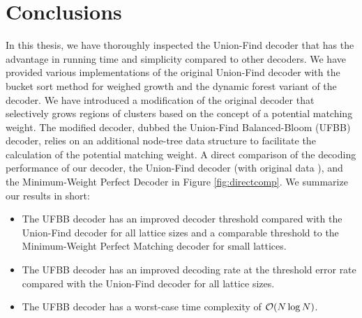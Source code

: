 \chapter{Conclusions}

In this thesis, we have thoroughly inspected the Union-Find decoder that has the advantage in running time and simplicity compared to other decoders. We have provided various implementations of the original Union-Find decoder with the bucket sort method for weighed growth and the dynamic forest variant of the decoder. We have introduced a modification of the original decoder that selectively grows regions of clusters based on the concept of a potential matching weight. The modified decoder, dubbed the Union-Find Balanced-Bloom (UFBB) decoder, relies on an additional node-tree data structure to facilitate the calculation of the potential matching weight. A direct comparison of the decoding performance of our decoder, the Union-Find decoder (with original data \cite{delfosse2017almost}), and the Minimum-Weight Perfect Decoder in Figure \ref{fig:directcomp}. We summarize our results in short:

\begin{itemize}
  \item The UFBB decoder has an improved decoder threshold compared with the Union-Find decoder for all lattice sizes and a comparable threshold to the Minimum-Weight Perfect Matching decoder for small lattices.
  \item The UFBB decoder has an improved decoding rate at the threshold error rate compared with the Union-Find decoder for all lattice sizes. 
  \item The UFBB decoder has a worst-case time complexity of $\mathcal{O}(N\log{N})$. 
\end{itemize}

